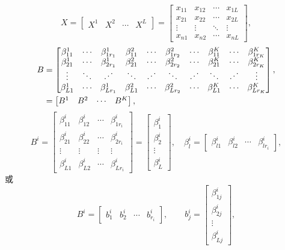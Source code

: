 \[
X=\begin{bmatrix}X^1&X^2&\cdots&X^L\end{bmatrix}
=\begin{bmatrix}
x_{11}&x_{12}&\cdots&x_{1L}\\
x_{21}&x_{22}&\cdots&x_{2L}\\
\vdots&\vdots&\ddots&\vdots\\
x_{n1}&x_{n2}&\cdots&x_{nL}
\end{bmatrix},
\]
\[
\begin{aligned}
B&=\begin{bmatrix}
\beta_{11}^1&\cdots&\beta_{1r_1}^1&\beta_{11}^2&\cdots&\beta_{1r_2}^2&\cdots&\beta_{11}^K&\cdots&\beta_{1r_K}^K\\
\beta_{21}^1&\cdots&\beta_{2r_1}^1&\beta_{21}^2&\cdots&\beta_{2r_2}^2&\cdots&\beta_{21}^K&\cdots&\beta_{2r_K}^K\\
\vdots&\ddots&\chFourBIddots&\ddots&\chFourBIddots&\ddots&\chFourBIddots&\ddots&\chFourBIddots&\vdots\\
\beta_{L1}^1&\cdots&\beta_{Lr_1}^1&\beta_{L1}^2&\cdots&\beta_{Lr_2}^2&\cdots&\beta_{L1}^K&\cdots&\beta_{Lr_K}^K
\end{bmatrix},\\
&=\begin{bmatrix}B^1&B^2&\cdots&B^K\end{bmatrix},
\end{aligned}
\]
\[
B^i=\begin{bmatrix}
\beta_{11}^i&\beta_{12}^i&\cdots&\beta_{1r_i}^i\\
\beta_{21}^i&\beta_{22}^i&\cdots&\beta_{2r_i}^i\\
\vdots&\vdots&\vdots&\vdots\\
\beta_{L1}^i&\beta_{L2}^i&\cdots&\beta_{Lr_i}^i
\end{bmatrix}
=\begin{bmatrix}\beta_1^i\\\beta_2^i\\\vdots\\\beta_L^i\end{bmatrix},\quad
\beta_l^i=\begin{bmatrix}\beta_{l1}^i&\beta_{l2}^i&\cdots&\beta_{lr_i}^i\end{bmatrix},
\]
或
\[
B^i=\begin{bmatrix}b_1^i&b_2^i&\cdots&b_{r_i}^i\end{bmatrix},\qquad
b_j^i=\begin{bmatrix}\beta_{1j}^i\\\beta_{2j}^i\\\vdots\\\beta_{Lj}^i\end{bmatrix},
\]
